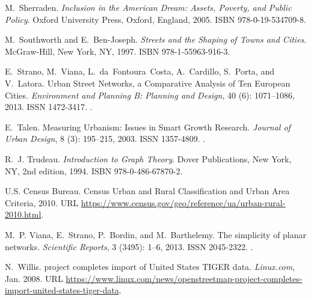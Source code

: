 \documentclass[Afour,sageh,times]{sagej}
\begin{document}
\begin{thebibliography}{54}
	M.~Sherraden.
	\newblock \emph{Inclusion in the {American} {Dream}: {Assets}, {Poverty}, and
		{Public} {Policy}}.
	\newblock Oxford University Press, Oxford, England, 2005.
	\newblock ISBN 978-0-19-534709-8.
	
	M.~Southworth and E.~Ben-Joseph.
	\newblock \emph{Streets and the {Shaping} of {Towns} and {Cities}}.
	\newblock McGraw-Hill, New York, NY, 1997.
	\newblock ISBN 978-1-55963-916-3.
	
	E.~Strano, M.~Viana, L.~da~Fontoura~Costa, A.~Cardillo, S.~Porta, and
	V.~Latora.
	\newblock Urban {Street} {Networks}, a {Comparative} {Analysis} of {Ten}
	{European} {Cities}.
	\newblock \emph{Environment and Planning B: Planning and Design}, 40
	(6): 1071--1086, 2013.
	\newblock ISSN 1472-3417.
	\newblock {}.
	
	E.~Talen.
	\newblock Measuring {Urbanism}: {Issues} in {Smart} {Growth} {Research}.
	\newblock \emph{Journal of Urban Design}, 8 (3): 195--215,
	2003.
	\newblock ISSN 1357-4809.
	\newblock {}.
	
	R.~J. Trudeau.
	\newblock \emph{Introduction to {Graph} {Theory}}.
	\newblock Dover Publications, New York, NY, 2nd edition, 1994.
	\newblock ISBN 978-0-486-67870-2.
	
	{U.S. Census Bureau}.
	 {Census} {Urban} and {Rural} {Classification} and {Urban} {Area}
	{Criteria}, 2010.
	\newblock URL
	\url{https://www.census.gov/geo/reference/ua/urban-rural-2010.html}.
	
	M.~P. Viana, E.~Strano, P.~Bordin, and M.~Barthelemy.
	\newblock The simplicity of planar networks.
	\newblock \emph{Scientific Reports}, 3 (3495): 1--6, 2013.
	\newblock ISSN 2045-2322.
	\newblock {}.
	
	N.~Willis.
	 project completes import of {United} {States} {TIGER}
	data.
	\newblock \emph{Linux.com}, Jan. 2008.
	\newblock URL
	\url{https://www.linux.com/news/openstreetmap-project-completes-import-united-states-tiger-data}.
	

\end{thebibliography}
\end{document}
